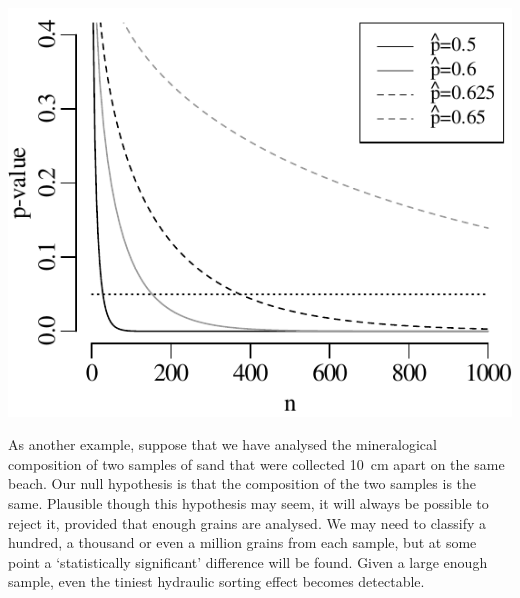 \noindent\begin{minipage}[t][][b]{.45\textwidth}
  \includegraphics[width=\textwidth]{../figures/binompvsn.pdf}
\end{minipage}
\begin{minipage}[t][][t]{.55\textwidth}
  \label{fig:binomnvsp}
\end{minipage}

As another example, suppose that we have analysed the mineralogical
composition of two samples of sand that were collected 10~cm apart on
the same beach. Our null hypothesis is that the composition of the two
samples is the same. Plausible though this hypothesis may seem, it
will always be possible to reject it, provided that enough grains are
analysed. We may need to classify a hundred, a thousand or even a
million grains from each sample, but at some point a `statistically
significant' difference will be found. Given a large enough sample,
even the tiniest hydraulic sorting effect becomes detectable.\medskip

